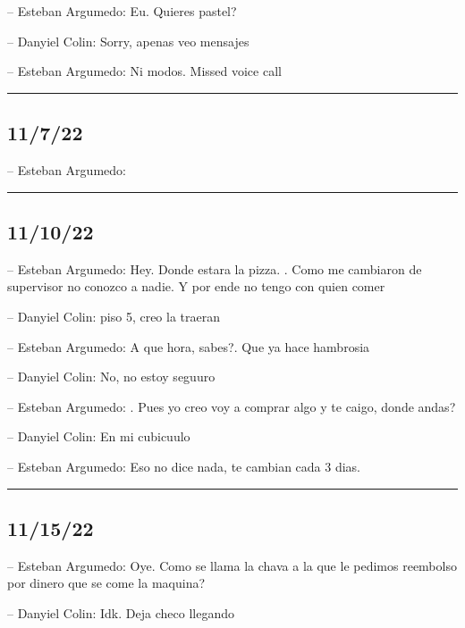 -- Esteban Argumedo: Eu. Quieres pastel?

-- Danyiel Colin: Sorry, apenas veo mensajes

-- Esteban Argumedo: Ni modos. Missed voice call

\begin{center}\rule{0.5\linewidth}{0.5pt}\end{center}

\hypertarget{section-162}{%
\subsection{11/7/22}\label{section-162}}

-- Esteban Argumedo:

\begin{center}\rule{0.5\linewidth}{0.5pt}\end{center}

\hypertarget{section-163}{%
\subsection{11/10/22}\label{section-163}}

-- Esteban Argumedo: Hey. Donde estara la pizza. . Como me cambiaron de
supervisor no conozco a nadie. Y por ende no tengo con quien comer

-- Danyiel Colin: piso 5, creo la traeran

-- Esteban Argumedo: A que hora, sabes?. Que ya hace hambrosia

-- Danyiel Colin: No, no estoy seguuro

-- Esteban Argumedo: . Pues yo creo voy a comprar algo y te caigo, donde
andas?

-- Danyiel Colin: En mi cubicuulo

-- Esteban Argumedo: Eso no dice nada, te cambian cada 3 dias.

\begin{center}\rule{0.5\linewidth}{0.5pt}\end{center}

\hypertarget{section-164}{%
\subsection{11/15/22}\label{section-164}}

-- Esteban Argumedo: Oye. Como se llama la chava a la que le pedimos
reembolso por dinero que se come la maquina?

-- Danyiel Colin: Idk. Deja checo llegando

